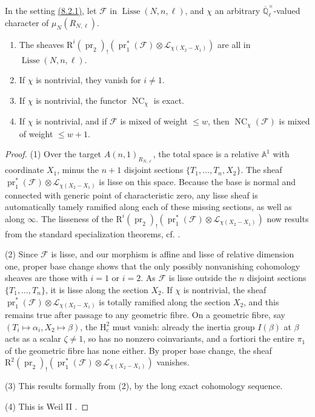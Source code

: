 In the setting \hyperref[par:8.2.1]{(8.2.1)}, let \(\mathcal{F}\) in \(\operatorname{Lisse}(N,n,\ell)\), and \(\chi\) an arbitrary \(\overline{\mathbb{Q}}_\ell^{\times}\)-valued character of \(\mu_N(R_{N,\ell})\).
\begin{enumerate}[label=(\arabic*)]
\item The sheaves \(\mathrm{R}^i(\operatorname{pr}_2)_!(\operatorname{pr}_1^*(\mathcal{F})\otimes\mathcal{L}_{\chi(X_2-X_1)})\) are all in \(\operatorname{Lisse}(N,n,\ell)\).
\item If \(\chi\) is nontrivial, they vanish for \(i\ne1\).
\item If \(\chi\) is nontrivial, the functor \(\operatorname{NC}_\chi\) is exact.
\item If \(\chi\) is nontrivial, and if \(\mathcal{F}\) is mixed of weight \(\leq w\), then \(\operatorname{NC}_\chi(\mathcal{F})\) is mixed of weight \(\leq w+1\).
\end{enumerate}
\begin{proof}
(1) Over the target \(A(n,1)_{R_{N,\ell}}\), the total space is a relative \(\mathbb{A}^1\) with coordinate \(X_1\), minus the \(n+1\) disjoint sections \(\{T_1,\ldots,T_n,X_2\}\). The sheaf \(\operatorname{pr}_1^*(\mathcal{F})\otimes\mathcal{L}_{\chi(X_2-X_1)}\) is lisse on this space. Because the base is normal and connected with generic point of characteristic zero, any lisse sheaf is automatically tamely ramified along each of these missing sections, as well as along \(\infty\). The lisseness of the \(\mathrm{R}^i(\operatorname{pr}_2)_!(\operatorname{pr}_1^*(\mathcal{F})\otimes\mathcal{L}_{\chi(X_2-X_1)})\) now results from the standard specialization theorems, cf. \cite[4.7.1]{Ka-SE}.

(2) Since \(\mathcal{F}\) is lisse, and our morphism is affine and lisse of relative dimension one, proper base change shows that the only possibly nonvanishing cohomology sheaves are those with \(i=1\) or \(i=2\). As \(\mathcal{F}\) is lisse outside the \(n\) disjoint sections \(\{T_1,\ldots,T_n\}\), it is lisse along the section \(X_2\). If \(\chi\) is nontrivial, the sheaf \(\operatorname{pr}_1^*(\mathcal{F})\otimes\mathcal{L}_{\chi(X_2-X_1)}\) is totally ramified along the section \(X_2\), and this remains true after passage to any geometric fibre. On a geometric fibre, say \((T_i\mapsto\alpha_i,X_2\mapsto\beta)\), the \(\mathrm{H}^2_c\) must vanish: already the inertia group \(I(\beta)\) at \(\beta\) acts as a scalar \(\zeta\ne1\), so has no nonzero coinvariants, and a fortiori the entire \(\pi_1\) of the geometric fibre has none either. By proper base change, the sheaf \(\mathrm{R}^2(\operatorname{pr}_2)_!(\operatorname{pr}_1^*(\mathcal{F})\otimes\mathcal{L}_{\chi(X_2-X_1)})\) vanishes.

(3) This results formally from (2), by the long exact cohomology sequence.

(4) This is Weil II \cite[3.3.1]{De-WeilII}.
\end{proof}

